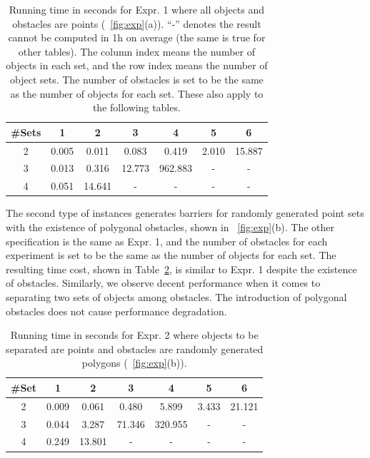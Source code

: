 \begin{table}[ht]
    \centering
    \begin{tabular}{|c|c|c|c|c|c|c|}\hline
        \#Sets &  1 & 2 & 3 & 4& 5& 6\\\hline
 2& 0.005 & 0.011 & 0.083 & 0.419 & 2.010 & 15.887 \\\hline
 3& 0.013 & 0.316 & 12.773 & 962.883 & - & - \\\hline
 4& 0.051 & 14.641 &  -& - &  -&- \\\hline
\end{tabular}
    \caption{Running time in seconds for Expr. 1 where all objects and obstacles are points (~\ref{fig:exp}(a)). ``-'' denotes the result cannot be computed in 1h on average (the same is true for other tables). 
    The column index means the number of objects in each set, and the row index means the number of object sets.
    The number of obstacles is set to be the same as the number of objects for each set. These also apply to the following tables.
    }
    \label{tab:expr_1}
\end{table}

 The second type of instances generates barriers for randomly generated 
 point sets with the existence of polygonal obstacles, shown in ~\ref{fig:exp}(b). 
 The other specification is the same as Expr. 1, and the number of obstacles for each experiment is set to be the same as the number of objects for each set. 
 The resulting time cost, shown in Table~\ref{tab:expr_2}, is similar to Expr. 1 despite the existence of obstacles.
 Similarly, we observe decent performance when it comes to separating two sets of objects among obstacles. 
 The introduction of polygonal obstacles does not cause performance degradation. 


\begin{table}[ht]
    \centering
    \begin{tabular}{|c|c|c|c|c|c|c|}\hline
        \#Set &  1 & 2 & 3 & 4& 5& 6\\\hline
2& 0.009 & 0.061 & 0.480 & 5.899 & 3.433 & 21.121\\\hline
 3& 0.044 & 3.287 & 71.346 & 320.955 & - & -\\\hline
 4& 0.249 & 13.801 & - & - & - & -\\\hline
    \end{tabular}
    \caption{Running time in seconds for Expr. 2 where objects to be separated are points and obstacles are randomly generated polygons (~\ref{fig:exp}(b)). 
    }
    \label{tab:expr_2}
    \vspace{-2mm}
\end{table}
 
